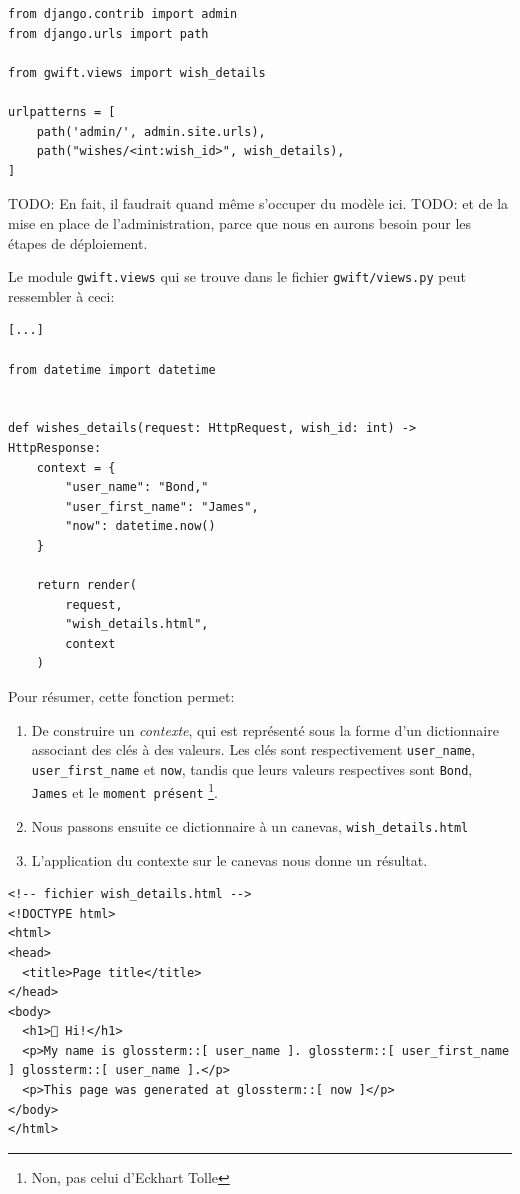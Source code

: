 \documentclass[11pt]{amsbook}
\begin{document}
\begin{verbatim}
from django.contrib import admin
from django.urls import path

from gwift.views import wish_details 

urlpatterns = [
    path('admin/', admin.site.urls),
    path("wishes/<int:wish_id>", wish_details), 
]
\end{verbatim}


TODO: En fait, il faudrait quand même s’occuper du modèle ici.
TODO: et de la mise en place de l’administration, parce que nous en aurons besoin pour les étapes de déploiement.





Le module \texttt{gwift.views} qui se trouve dans le fichier \texttt{gwift/views.py} peut ressembler à ceci:


\begin{verbatim}
[...]

from datetime import datetime


def wishes_details(request: HttpRequest, wish_id: int) -> HttpResponse:
    context = {
        "user_name": "Bond,"
        "user_first_name": "James",
        "now": datetime.now()
    }

    return render(
        request,
        "wish_details.html",
        context
    )
\end{verbatim}

Pour résumer, cette fonction permet:


\begin{enumerate}

\item{De construire un \emph{contexte}, qui est représenté sous la forme d’un dictionnaire associant des clés à des valeurs. Les clés sont respectivement \texttt{user\_name}, \texttt{user\_first\_name} et \texttt{now}, tandis que leurs valeurs respectives sont \texttt{Bond}, \texttt{James} et le \texttt{moment présent} \footnote{Non, pas celui d’Eckhart Tolle}.}

\item{Nous passons ensuite ce dictionnaire à un canevas, \texttt{wish\_details.html}}

\item{L’application du contexte sur le canevas nous donne un résultat.}

\end{enumerate}


\begin{verbatim}
<!-- fichier wish_details.html -->
<!DOCTYPE html>
<html>
<head>
  <title>Page title</title>
</head>
<body>
  <h1>👤 Hi!</h1>
  <p>My name is glossterm::[ user_name ]. glossterm::[ user_first_name ] glossterm::[ user_name ].</p>
  <p>This page was generated at glossterm::[ now ]</p>
</body>
</html>
\end{verbatim}
\end{document}
